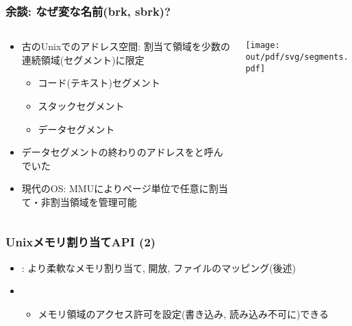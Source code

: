 \documentclass[12pt,dvipdfmx]{beamer}
\begin{document}
\begin{frame}
  \frametitle{余談: なぜ変な名前(brk, sbrk)?}
  \begin{columns}
    \begin{column}{0.6\textwidth}
      \begin{itemize}
      \item 古のUnixでのアドレス空間: 割当て領域を少数の連続領域(セグメント)に限定
        \begin{itemize}
        \item コード(テキスト)セグメント
        \item スタックセグメント
        \item データセグメント
        \end{itemize}
      \item データセグメントの終わりのアドレスをと呼んでいた
      \item 現代のOS:
        MMUによりページ単位で任意に割当て・非割当領域を管理可能
      \end{itemize}
    \end{column}
    \begin{column}{0.4\textwidth}
      \texttt{[image: out/pdf/svg/segments.pdf]}
    \end{column}
  \end{columns}

\end{frame}

\begin{frame}
  \frametitle{Unixメモリ割り当てAPI (2)}
  \begin{itemize}
  \item {} : より柔軟なメモリ割り当て, 開放, ファイルのマッピング(後述)
  \item {}
    \begin{itemize}
    \item メモリ領域のアクセス許可を設定(書き込み, 読み込み不可に)できる
    \end{itemize}
  \end{itemize}
\end{frame}
\end{document}
